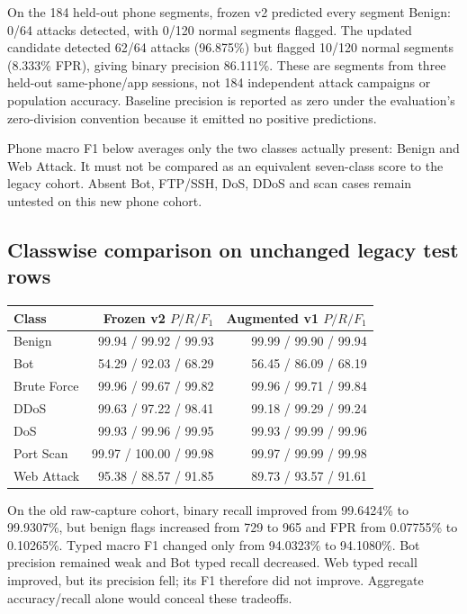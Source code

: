 \documentclass[11pt,a4paper,oneside]{report}
\begin{document}
On the 184 held-out phone segments, frozen v2 predicted every segment Benign: 0/64 attacks detected, with 0/120 normal segments flagged. The updated candidate detected 62/64 attacks (96.875\%) but flagged 10/120 normal segments (8.333\% FPR), giving binary precision 86.111\%. These are segments from three held-out same-phone/app sessions, not 184 independent attack campaigns or population accuracy. Baseline precision is reported as zero under the evaluation's zero-division convention because it emitted no positive predictions.

Phone macro F1 below averages only the two classes actually present: Benign and Web Attack. It must not be compared as an equivalent seven-class score to the legacy cohort. Absent Bot, FTP/SSH, DoS, DDoS and scan cases remain untested on this new phone cohort.

\subsection{Classwise comparison on unchanged legacy test rows}

{\small
\begin{longtable}{@{}lrr@{}}
\toprule
Class & Frozen v2 $P/R/F_1$ & Augmented v1 $P/R/F_1$\\\midrule\endhead
Benign & 99.94 / 99.92 / 99.93 & 99.99 / 99.90 / 99.94\\
Bot & 54.29 / 92.03 / 68.29 & 56.45 / 86.09 / 68.19\\
Brute Force & 99.96 / 99.67 / 99.82 & 99.96 / 99.71 / 99.84\\
DDoS & 99.63 / 97.22 / 98.41 & 99.18 / 99.29 / 99.24\\
DoS & 99.93 / 99.96 / 99.95 & 99.93 / 99.99 / 99.96\\
Port Scan & 99.97 / 100.00 / 99.98 & 99.97 / 99.99 / 99.98\\
Web Attack & 95.38 / 88.57 / 91.85 & 89.73 / 93.57 / 91.61\\
\bottomrule\end{longtable}
}

On the old raw-capture cohort, binary recall improved from 99.6424\% to 99.9307\%, but benign flags increased from 729 to 965 and FPR from 0.07755\% to 0.10265\%. Typed macro F1 changed only from 94.0323\% to 94.1080\%. Bot precision remained weak and Bot typed recall decreased. Web typed recall improved, but its precision fell; its F1 therefore did not improve. Aggregate accuracy/recall alone would conceal these tradeoffs.
\end{document}
